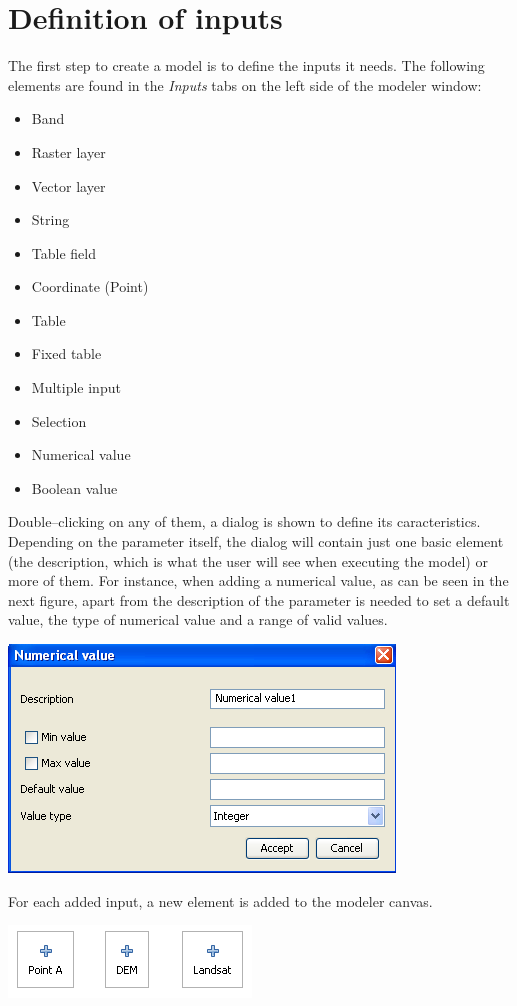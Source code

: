\section{Definition of inputs}

The first step to create a model is to define the inputs it needs. The following elements are found in the \emph{Inputs} tabs on the left side of the modeler window:

\begin{itemize}
	\item Band
	\item Raster layer
	\item Vector layer 
	\item String
	\item Table field
	\item Coordinate (Point)  
	\item Table
	\item Fixed table
	\item Multiple input
	\item Selection
	\item Numerical value 
	\item Boolean value 
\end{itemize}

Double--clicking on any of them, a dialog is shown to define its caracteristics. Depending on the parameter itself, the dialog will contain just one basic element (the description, which is what the user will see when executing the model) or more of them. For instance, when adding a numerical value, as can be seen in the next figure, apart from the description of the parameter is needed to set a default value, the type of numerical value and a range of valid values.

\begin{center}
\includegraphics[width=.4\columnwidth]{models_parameters.png}
\end{center}

For each added input, a new element is added to the modeler canvas.

\begin{center}
\includegraphics[width=.4\columnwidth]{models_parameters2.png}
\end{center}

